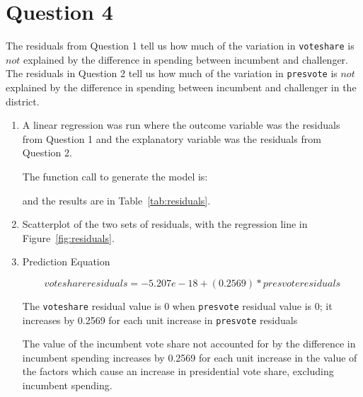 \documentclass[12pt,letterpaper]{article}
\begin{document}
\section*{Question 4}
\noindent The residuals from Question 1 tell us how much of the variation in \texttt{voteshare} is $not$ explained by the difference in spending between incumbent and challenger. The residuals in Question 2 tell us how much of the variation in \texttt{presvote} is $not$ explained by the difference in spending between incumbent and challenger in the district.
	\begin{enumerate}
		\item A linear regression was run where the outcome variable was the residuals from Question 1 
		and the explanatory variable was the residuals from Question 2.	
		
      The function call to generate the model is:
	    

	    and the results are in Table~\ref{tab:residuals}.

		\item Scatterplot of the two sets of residuals, with the regression line in 
		Figure~\ref{fig:residuals}.

		\item Prediction Equation
	
	\[voteshare residuals  = -5.207e-18 + (0.2569) * presvote residuals\]
	
	  The \texttt{voteshare} residual value is 0 when \texttt{presvote} residual value is 0; 
	   it increases by 0.2569 for each unit increase in \texttt{presvote} residuals

  The value of the incumbent vote share not accounted for by the difference in incumbent spending increases by 0.2569 for each unit increase in the value of the factors which cause an increase in presidential vote share, excluding incumbent spending.

	\end{enumerate}
	
  
\end{document}
